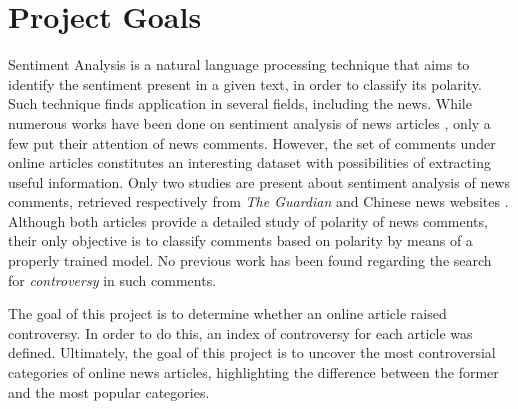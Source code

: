 \section{Project Goals}
Sentiment Analysis is a natural language processing technique that aims to identify the sentiment present in a given text, in order to classify its polarity. Such technique finds application in several fields, including the news. While numerous works have been done on sentiment analysis of news articles \cite{News_1, News_2}, only a few put their attention of news comments. However, the set of comments under online articles constitutes an interesting dataset with possibilities of extracting useful information.
Only two studies are present about sentiment analysis of news comments, retrieved respectively from \textit{The Guardian} \cite{Guardian} and Chinese news websites \cite{Chinese}. Although both articles provide a detailed study of polarity of news comments, their only objective is to classify comments based on polarity by means of a properly trained model. No previous work has been found regarding the search for \textit{controversy} in such comments. 

\noindent The goal of this project is to determine whether an online article raised controversy. In order to do this, an index of controversy for each article was defined. Ultimately, the goal of this project is to uncover the most controversial categories of online news articles, highlighting the difference between the former and the most popular categories.